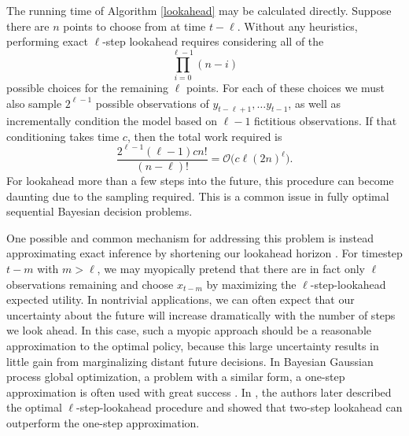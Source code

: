 \documentclass{article}
\newcommand{\cm}[1]{\mathcal{#1}}
\begin{document}
The running time of Algorithm \ref{lookahead} may be calculated
directly.  Suppose there are $n$ points to choose from at time $t -
\ell$.  Without any heuristics, performing exact $\ell$-step lookahead
requires considering all of the
\begin{equation*}
  \prod_{i = 0}^{\ell-1} (n - i)
\end{equation*}
possible choices for the remaining $\ell$ points. For each of these
choices we must also sample $2^{\ell - 1}$ possible observations of
$y_{t-\ell + 1}, \dotsc y_{t-1}$, as well as incrementally condition
the model based on $\ell - 1$ fictitious observations.  If that
conditioning takes time $c$, then the total work required is
\begin{equation*}
  \frac{2^{\ell - 1} (\ell-1)c n!}{(n - \ell)!} 
  = 
  \cm{O}\bigl(c\ell(2n)^\ell\bigr).
\end{equation*}
For lookahead more than a few steps into the future, this procedure
can become daunting due to the sampling required.  This is a common
issue in fully optimal sequential Bayesian decision problems.

One possible and common mechanism for addressing this problem is
instead approximating exact inference by shortening our lookahead
horizon \citep{ego, gpgo}.  For timestep $t - m$ with $m > \ell$, we
may myopically pretend that there are in fact only $\ell$ observations
remaining and choose $x_{t-m}$ by maximizing the $\ell$-step-lookahead
expected utility.  In nontrivial applications, we can often expect
that our uncertainty about the future will increase dramatically with
the number of steps we look ahead. In this case, such a myopic
approach should be a reasonable approximation to the optimal policy,
because this large uncertainty results in little gain from
marginalizing distant future decisions.  In Bayesian Gaussian process
global optimization, a problem with a similar form, a one-step
approximation is often used with great success \citep{ego}.  In
\citep{gpgo}, the authors later described the optimal
$\ell$-step-lookahead procedure and showed that two-step lookahead
can outperform the one-step approximation.
\end{document}
